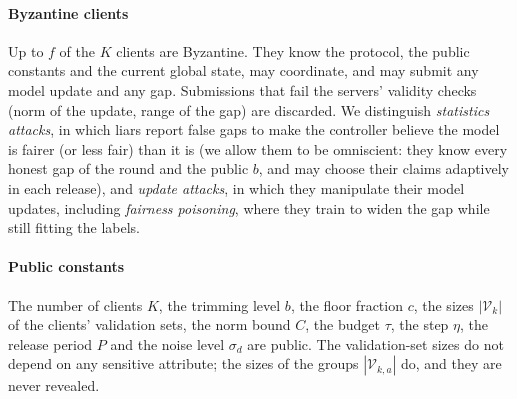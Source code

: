 \paragraph{Byzantine clients}
Up to $f$ of the $K$ clients are Byzantine. They know the protocol, the public constants and the current global state, may coordinate, and may submit any model update and any gap. Submissions that fail the servers' validity checks (norm of the update, range of the gap) are discarded. We distinguish \emph{statistics attacks}, in which liars report false gaps to make the controller believe the model is fairer (or less fair) than it is (we allow them to be omniscient: they know every honest gap of the round and the public $b$, and may choose their claims adaptively in each release), and \emph{update attacks}, in which they manipulate their model updates, including \emph{fairness poisoning}, where they train to widen the gap while still fitting the labels.

\paragraph{Public constants}
The number of clients $K$, the trimming level $b$, the floor fraction $c$, the sizes $|\mathcal{V}_k|$ of the clients' validation sets, the norm bound $C$, the budget $\tau$, the step $\eta$, the release period $P$ and the noise level $\sigma_d$ are public. The validation-set sizes do not depend on any sensitive attribute; the sizes of the groups $|\mathcal{V}_{k,a}|$ do, and they are never revealed.
